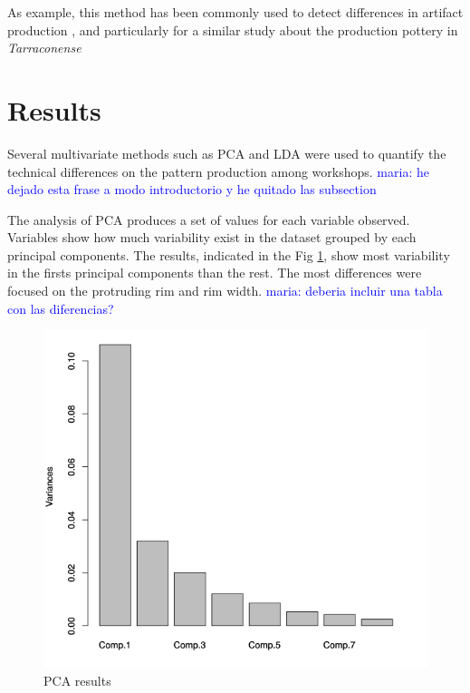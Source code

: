 \documentclass[review]{elsarticle}
\newcommand{\memo}[2]{\textcolor{#1}{#2}}
\newcommand{\maria}[1]{\memo{blue}{maria: #1\\}}
\begin{document}
As example, this method has been commonly used to detect differences in  artifact production \citep{charlton_investigating_2012, thorpe_distribution_1984}, and particularly for a similar study about the production pottery in \emph{Tarraconense} \citep{i_martin_alisis_1998}



\section{Results}

Several multivariate methods such as PCA and LDA were used to quantify the technical differences on the pattern production among workshops. 
\maria{he dejado esta frase a modo introductorio y he quitado las subsection} 

The analysis of PCA produces a set of values for each variable observed. Variables show how much variability exist in the dataset grouped by each principal components. The results, indicated in the Fig \ref{pcaresults}, show most variability in the firsts principal components than the rest.
The most differences were focused on the protruding rim and rim width.  
\maria{deberia incluir una tabla con las diferencias?}


\begin{figure}[htp]
	\centering
\includegraphics[scale=0.30]{pcaresults.png}
\caption{PCA results}
\label{pcaresults}
\end{figure} 
\end{document}
